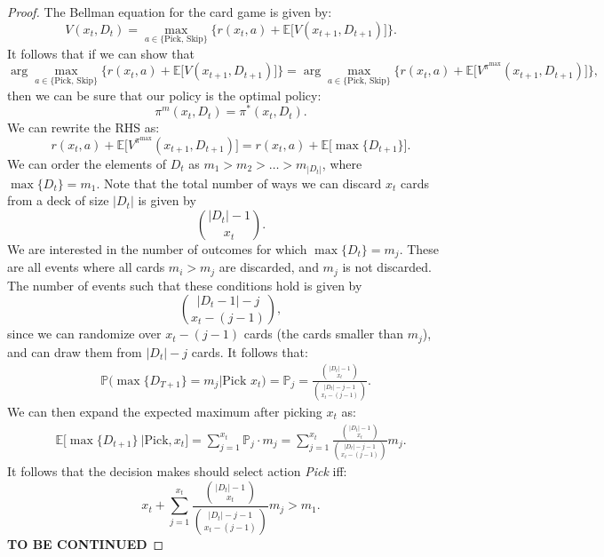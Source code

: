 \documentclass{article}
\begin{document}
\begin{proof}
    The Bellman equation for the card game is given by:
    \begin{equation}
        V(x_t, D_t) =  \max_{a \in \{\text{Pick, Skip}\}}\Big\{r(x_t,a) + \mathbb{E}\Big[V(x_{t+1}, D_{t+1})\Big]\Big\}.
    \end{equation}
    It follows that if we can show that
    \begin{equation}
        \arg \max_{a \in \{\text{Pick, Skip}\}}\Big\{r(x_t,a) + \mathbb{E}\Big[V(x_{t+1}, D_{t+1})\Big]\Big\} = \arg \max_{a \in \{\text{Pick, Skip}\}}\Big\{r(x_t,a) + \mathbb{E}\Big[V^{\pi^{\max}}(x_{t+1}, D_{t+1})\Big]\Big\},
    \end{equation}
    then  we can be sure that our policy is the optimal policy:
    \begin{equation}
        \pi^m(x_t, D_t) = \pi^*(x_t, D_t).
    \end{equation}
    We can rewrite the RHS as:
    \begin{equation}
        r(x_t,a) + \mathbb{E}\Big[V^{\pi^{\max}}(x_{t+1}, D_{t+1})\Big] = r(x_t,a) + \mathbb{E}\big[\max\{D_{t+1}\}\big].
    \end{equation}
    We can order the elements of $D_t$ as $m_1 > m_2 > \dots > m_{|D_t|}$, where $\max\{D_t\} = m_1$.
    Note that the total number of ways we can discard $x_t$ cards from a deck of size $|D_t|$ is given by
    \begin{equation}
        \binom{|D_t|-1}{x_t}.
    \end{equation}
    We are interested in the number of outcomes for which $\max\{D_t\}=m_j$. These are all events where all cards $m_i>m_j$ are discarded, and $m_j$ is not discarded. The number of events such that these conditions hold is given by
    \begin{equation}
        \binom{|D_t-1|-j}{x_t-(j-1)},
    \end{equation}
    since we can randomize over $x_t-(j-1)$ cards (the cards smaller than $m_j$), and can draw them from $|D_t|-j$ cards. It follows that:
    \begin{align}
         & \mathbb{P}\Big(\max\{D_{T+1}\}  = m_j \big| \text{Pick } x_t\Big) = \mathbb{P}_j  = \frac{\binom{|D_t|-1}{x_t}}{\binom{|D_t|-j-1}{x_t-(j-1)}} .
    \end{align}
    We can then expand the expected maximum after picking $x_t$ as:
    \begin{align}
        \mathbb{E}\big[\max\{D_{t+1}\} \ | \text{Pick}, x_t\big] = \sum^{x_t}_{j=1} \mathbb{P}_j\cdot m_j = \sum^{x_t}_{j=1} \frac{\binom{|D_t|-1}{x_t}}{\binom{|D_t|-j-1}{x_t-(j-1)}}  m_j.
    \end{align}
    It follows that the decision makes should select action \textit{Pick} iff:
    \begin{equation}
        x_t+ \sum^{x_t}_{j=1} \frac{\binom{|D_t|-1}{x_t}}{\binom{|D_t|-j-1}{x_t-(j-1)}}  m_j > m_1.
    \end{equation}
    \textbf{TO BE CONTINUED}





\end{proof}
\end{document}
